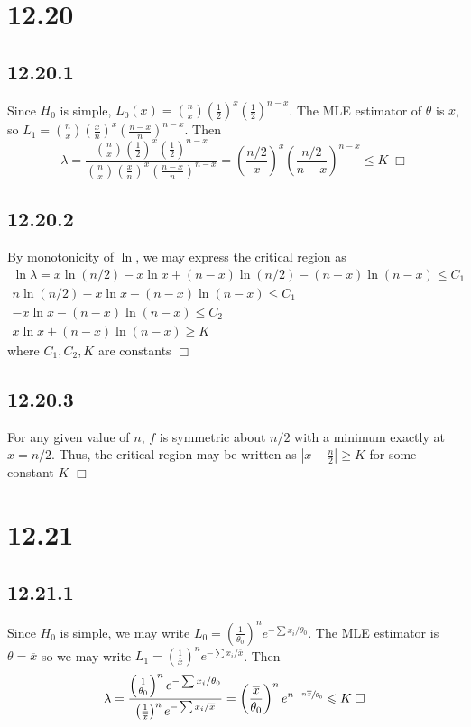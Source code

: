 \documentclass{article}
\begin{document}
\section*{12.20}
\subsection*{12.20.1}
Since $H_0$ is simple, $L_0(x) = \binom{n}{x} \left(\frac{1}{2}\right)^x \left(\frac{1}{2}\right)^{n-x}$. The MLE estimator of $\theta$ is $x$, so $L_1 = \binom{n}{x} \left(\frac{x}{n}\right)^x \left(\frac{n-x}{n}\right)^{n-x}$. Then
$$\lambda = \frac{\binom{n}{x} \left(\frac{1}{2}\right)^x \left(\frac{1}{2}\right)^{n-x}}{\binom{n}{x} \left(\frac{x}{n}\right)^x \left(\frac{n-x}{n}\right)^{n-x}} = \left(\frac{n/2}{x} \right)^x \left(\frac{n/2}{n-x}\right)^{n-x} \leqslant K \; \Box$$

\subsection*{12.20.2}
By monotonicity of $\ln$, we may express the critical region as
\begin{gather*}
\ln\lambda = x\ln(n/2) - x\ln x + (n-x)\ln(n/2) - (n-x)\ln(n-x) \leqslant C_1\\
n\ln(n/2) - x\ln x - (n-x)\ln(n-x) \leqslant C_1\\
- x\ln x - (n-x)\ln(n-x) \leqslant C_2\\
x\ln x + (n-x)\ln(n-x) \geqslant K
\end{gather*}
where $C_1, C_2, K$ are constants $\Box$

\subsection*{12.20.3}
For any given value of $n$, $f$ is symmetric about $n/2$ with a minimum exactly at $x = n/2$. Thus, the critical region may be written as $|x-\frac{n}{2}| \geqslant K$ for some constant $K$ $\Box$

\section*{12.21}
\subsection*{12.21.1}
Since $H_0$ is simple, we may write $L_0 = \left(\frac{1}{\theta_0}\right)^n e^{-\sum x_i / \theta_0}$. The MLE estimator is $\theta = \overline{x}$ so we may write $L_1 = \left(\frac{1}{\overline{x}}\right)^n e^{-\sum x_i / \overline{x}}$. Then
$$\lambda = \frac{\left(\frac{1}{\theta_0}\right)^n e^{-\sum x_i / \theta_0}}{\left(\frac{1}{\overline{x}} \right)^n e^{-\sum x_i / \overline{x}}} = \left(\frac{\overline{x}}{\theta_0}\right)^n e^{n - \sfrac{n\overline{x}}{\theta_0}} \leqslant K \; \Box$$
\end{document}
